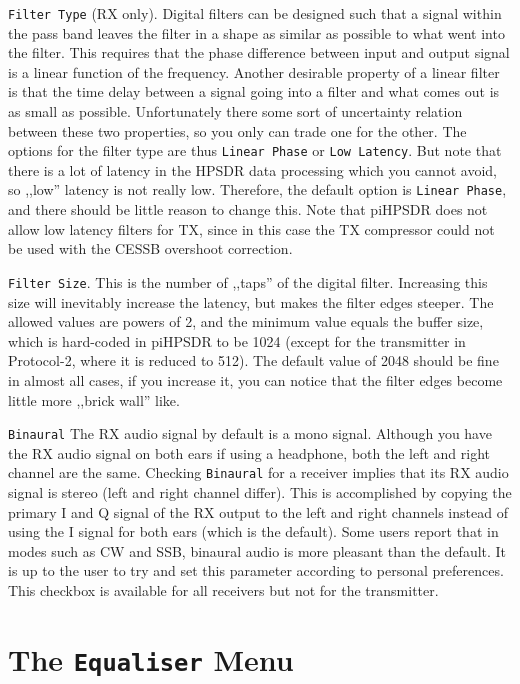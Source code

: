 \documentclass[12pt]{book}
\def\rett#1{\texttt{\color{red}#1}}
\def\pH{pi\-HPSDR\xspace}
\begin{document}
\rett{Filter Type} (RX only). Digital filters can be designed such that a signal within the
pass band leaves the filter in a shape as similar as possible
to what went into the filter. This requires that the phase
difference between input and output signal is a linear
function of the frequency. Another desirable property
of a linear filter is that the time delay between a signal
going into a filter and what comes out is as small as
possible. Unfortunately there some sort of uncertainty
relation between these two properties, so you only can
trade one for the other. The options for the filter type
are thus \rett{Linear Phase} or \rett{Low Latency}.
But note that there is a lot of latency in the HPSDR data
processing which you cannot avoid, so ,,low'' latency
is not really low. Therefore, the default option
is \rett{Linear Phase}, and there should be little reason
to change this. Note that \pH does not allow low latency
filters for TX, since in this case the TX compressor
could not be used with the CESSB overshoot correction.

\rett{Filter Size}. This is the number of ,,taps'' of the digital
filter. Increasing this size will inevitably increase the latency,
but makes the filter edges steeper. The allowed values are
powers of 2, and the minimum value equals the buffer size, which
is hard-coded in \pH to be 1024 (except for the transmitter in Protocol-2,
where it is reduced to 512). The default value of 2048 should be
fine in almost all cases, if you increase it, you can notice that
the filter edges become little more ,,brick wall'' like.

\rett{Binaural} The RX audio signal by default is a mono signal. Although
you have the RX audio signal on both ears if using a headphone, both the
left and right channel are the same. Checking \rett{Binaural} for a
receiver implies that its RX audio signal is stereo (left and right channel
differ). This is accomplished by copying the primary I and Q signal of the
RX output to the left and right channels instead of using the I signal
for both ears (which is the default). Some users report that in modes
such as CW and SSB, binaural audio is more pleasant than the default.
It is up to the user to try and set this parameter according to personal
preferences. This checkbox is available for all receivers but not for the
transmitter.

\section{The \texttt{Equaliser} Menu}
\label{sec:eqmenu}
\end{document}
